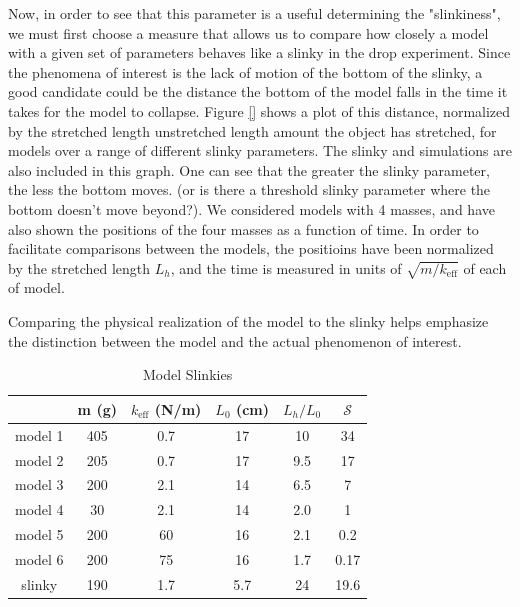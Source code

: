 \documentclass[prb,preprint]{revtex4-1}
\begin{document}
Now, in order to see that this parameter is a useful determining the "slinkiness", we must first choose a measure that allows us to compare how closely a model
with a given set of parameters behaves like a slinky in the drop experiment.  Since the phenomena of interest is the lack of motion of the bottom of the slinky, 
a good candidate could be the distance the bottom of the model falls in the time it takes for the model to collapse.  Figure \ref{} shows a plot of this distance, normalized by the stretched length unstretched length amount the object has stretched, for models over a range of different slinky parameters.  The slinky and simulations are also included in this graph.  One can see that the greater the slinky parameter, the less the bottom moves.  (or is there a threshold slinky parameter where  the bottom doesn't move beyond?).  We considered models with 4 masses, and have also shown the positions of the four masses as a function of time.  In order to facilitate comparisons between the models, the positioins have been normalized by the stretched length $L_h$, and the time is measured in units of $\sqrt{m/k_{\text{eff}}}$ of each of model.  


Comparing the physical realization of the model to the slinky 
helps emphasize the distinction between the model and the actual phenomenon of interest.


\begin{table}[ht]
\caption{Model Slinkies} %
\centering %
\begin{tabular}{c c c c c c} %
\hline\hline %
 & m (g) & $k_\text{eff}$ (N/m) & $L_0$ (cm) & $L_h/L_0$ & $\mathcal{S}$ \\ [0.5ex] %
\hline %
model 1 & 405 & 0.7 	& 17   & 10	& 34		\\ %
model 2 & 205 & 0.7	& 17   & 9.5	& 17		\\
model 3 & 200 & 2.1	& 14   & 6.5	& 7		\\
model 4 & 30   & 2.1	& 14   & 2.0	& 1		\\
model 5 & 200 & 60	& 16   & 2.1	& 0.2		\\
model 6 & 200 & 75	& 16   & 1.7	& 0.17		\\
slinky     & 190 & 1.7   & 5.7   & 24	& 19.6		\\ [1ex] %
\hline %
\end{tabular}
\label{table:slinkies} %
\end{table}
 
\end{document}
